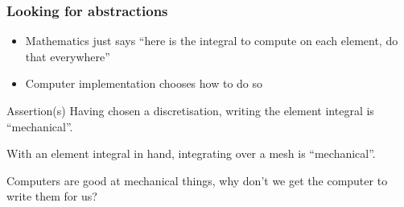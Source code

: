 \documentclass[presentation, 10pt]{beamer}
\begin{document}
\begin{frame}[t]
  \frametitle{Looking for abstractions}
  \begin{itemize}
  \item Mathematics just says ``here is the integral to compute on each
    element, do that everywhere''
  \item Computer implementation chooses how to do so
  \end{itemize}
  \begin{block}{Assertion(s)}
    \vspace{0.25\baselineskip}
    Having chosen a discretisation, writing the element integral is ``mechanical''.

    With an element integral in hand, integrating over a mesh is
    ``mechanical''.
  \end{block}

  \begin{corollary}
    \vspace{0.25\baselineskip}
    Computers are good at mechanical things, why don't we get the
    computer to write them for us?
  \end{corollary}
\end{frame}
\end{document}
